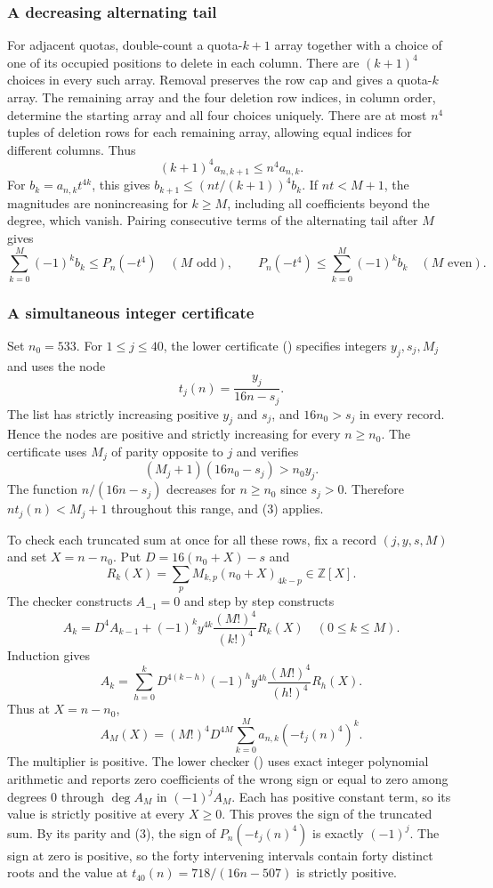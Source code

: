 \documentclass[11pt]{article}
\begin{document}
\subsubsection{A decreasing alternating tail}
\label{sec:a-decreasing-alternating-tail}

For adjacent quotas, double-count a quota-$k+1$ array together with a choice of one of its occupied positions to delete in each column. There are $(k+1)^4$ choices in every such array. Removal preserves the row cap and gives a quota-$k$ array. The remaining array and the four deletion row indices, in column order, determine the starting array and all four choices uniquely. There are at most $n^4$ tuples of deletion rows for each remaining array, allowing equal indices for different columns. Thus
\[
(k+1)^4 a_{n,k+1}\le n^4 a_{n,k}.
\tag{2}
\]
For $b_k=a_{n,k}t^{4k}$, this gives $b_{k+1}\le (nt/(k+1))^4 b_k$. If $nt<M+1$, the magnitudes are nonincreasing for $k\ge M$, including all coefficients beyond the degree, which vanish. Pairing consecutive terms of the alternating tail after $M$ gives
\[
\sum_{k=0}^M(-1)^k b_k\le P_n(-t^4)\quad(M\text{ odd}),\qquad
P_n(-t^4)\le\sum_{k=0}^M(-1)^k b_k\quad(M\text{ even}).
\tag{3}
\]

\subsubsection{A simultaneous integer certificate}
\label{sec:a-simultaneous-integer-certificate}

Set $n_0=533$. For $1\le j\le40$, the lower certificate () specifies integers $y_j,s_j,M_j$ and uses the node
\[
t_j(n)=\frac{y_j}{16n-s_j}.
\]
The list has strictly increasing positive $y_j$ and $s_j$, and $16n_0>s_j$ in every record. Hence the nodes are positive and strictly increasing for every $n\ge n_0$. The certificate uses $M_j$ of parity opposite to $j$ and verifies
\[
(M_j+1)(16n_0-s_j)>n_0 y_j.
\]
The function $n/(16n-s_j)$ decreases for $n\ge n_0$ since $s_j>0$. Therefore $nt_j(n)<M_j+1$ throughout this range, and (3) applies.

To check each truncated sum at once for all these rows, fix a record $(j,y,s,M)$ and set $X=n-n_0$. Put $D=16(n_0+X)-s$ and
\[
R_k(X)=\sum_p M_{k,p}(n_0+X)_{4k-p}\in\mathbb Z[X].
\]
The checker constructs $A_{-1}=0$ and step by step constructs
\[
A_k = D^4 A_{k-1}+(-1)^k y^{4k}\frac{(M!)^4}{(k!)^4}R_k(X)
\quad (0\le k\le M).
\]
Induction gives
\[
A_k=\sum_{h=0}^{k}D^{4(k-h)}(-1)^h y^{4h}\frac{(M!)^4}{(h!)^4}R_h(X).
\]
Thus at $X=n-n_0$,
\[
A_M(X)=(M!)^4 D^{4M}\sum_{k=0}^M a_{n,k}(-t_j(n)^4)^k.
\tag{4}
\]
The multiplier is positive. The lower checker () uses exact integer polynomial arithmetic and reports zero coefficients of the wrong sign or equal to zero among degrees $0$ through $\deg A_M$ in $(-1)^j A_M$. Each has positive constant term, so its value is strictly positive at every $X\ge0$. This proves the sign of the truncated sum. By its parity and (3), the sign of $P_n(-t_j(n)^4)$ is exactly $(-1)^j$. The sign at zero is positive, so the forty intervening intervals contain forty distinct roots and the value at $t_{40}(n)=718/(16n-507)$ is strictly positive.
\end{document}
